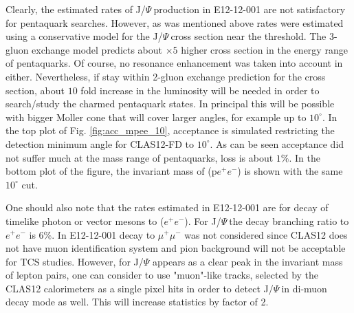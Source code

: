 \documentclass[12pt]{revtex4}
\newcommand{\JP}{J/$\Psi~$}
\begin{document}
Clearly, the estimated rates of \JP production in E12-12-001 are not satisfactory for pentaquark searches. However, as was mentioned above rates were estimated using a conservative model for the \JP cross section near the threshold. The 3-gluon exchange model predicts about $\times 5$ higher cross section in the energy range of pentaquarks. Of course, no resonance enhancement was taken into account in either. Nevertheless, if stay within 2-gluon exchange prediction for the cross section, about $10$ fold increase in the luminosity will be needed in order to search/study the charmed pentaquark states. In principal this will be possible with bigger Moller cone that will cover larger angles, for example up to $10^\circ$. In the top plot of Fig. \ref{fig:acc_mpee_10}, acceptance is simulated restricting the detection minimum angle for CLAS12-FD to $10^\circ$. As can be seen acceptance did not suffer much at the mass range of pentaquarks, loss is about $1\%$. In the bottom plot of the figure, the invariant mass of (p$e^+e^-$) is shown with the same $10^\circ$ cut. 

One should also note that the rates estimated in E12-12-001 are for decay of timelike photon or vector mesons to ($e^+e^-$). For \JP the decay branching ratio to $e^+e^-$ is $6\%$. In E12-12-001 decay to $\mu^+\mu^-$ was not considered since CLAS12 does not have muon identification system and pion background will not be acceptable for TCS studies. However, for J/$\Psi$ appears as a clear peak in the invariant mass of lepton pairs, one can consider to use "muon"-like tracks, selected by the CLAS12 calorimeters as a single pixel hits in order to detect \JP in di-muon decay mode as well. This will increase statistics by factor of 2. 
\end{document}
